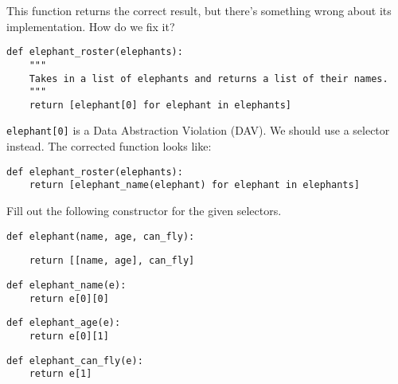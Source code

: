 
\begin{blocksection}
\question This function returns the correct result, but there's something wrong
about its implementation. How do we fix it?

\begin{lstlisting}
def elephant_roster(elephants):
    """
    Takes in a list of elephants and returns a list of their names.
    """
    return [elephant[0] for elephant in elephants]
\end{lstlisting}
\begin{solution}[1in]
\lstinline{elephant[0]} is a Data Abstraction Violation (DAV).
We should use a selector instead.
The corrected function looks like:
\begin{lstlisting}
def elephant_roster(elephants):
    return [elephant_name(elephant) for elephant in elephants]
\end{lstlisting}
\end{solution}

\end{blocksection}


\begin{blocksection}
\question Fill out the following constructor for the given selectors.

\begin{lstlisting}
def elephant(name, age, can_fly):
\end{lstlisting}
\begin{solution}[1in]
\begin{lstlisting}
    return [[name, age], can_fly]
\end{lstlisting}
\end{solution}

\begin{lstlisting}
def elephant_name(e):
    return e[0][0]
\end{lstlisting}

\begin{lstlisting}
def elephant_age(e):
    return e[0][1]
\end{lstlisting}

\begin{lstlisting}
def elephant_can_fly(e):
    return e[1]
\end{lstlisting}

\end{blocksection}


